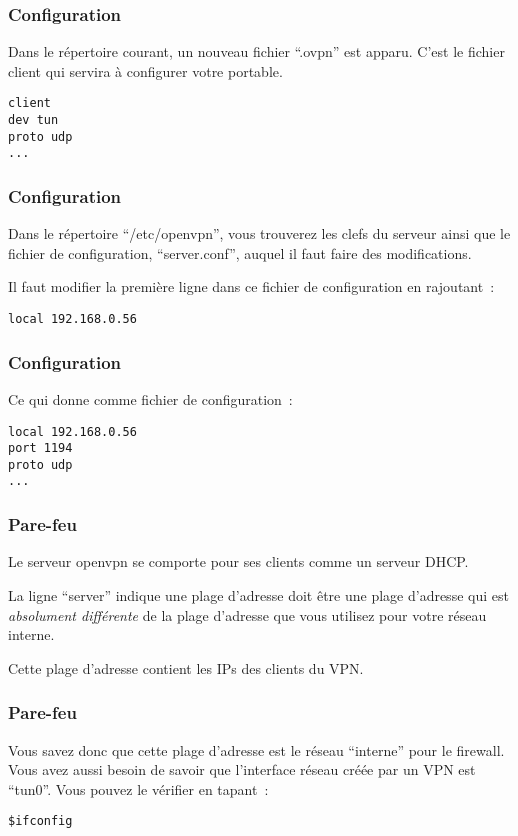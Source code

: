 \begin{frame}[containsverbatim]
\frametitle{Configuration}

Dans le répertoire courant, un nouveau fichier ``.ovpn'' est apparu. C'est le fichier client qui servira à configurer votre portable.

\begin{verbatim}
client
dev tun
proto udp
...
\end{verbatim}
\end{frame}

\begin{frame}[containsverbatim]
\frametitle{Configuration}

Dans le répertoire ``/etc/openvpn'', vous trouverez les clefs du serveur ainsi que le fichier de configuration, ``server.conf'',  auquel il faut faire des modifications.

Il faut modifier la première ligne dans ce fichier de configuration en rajoutant~:
\begin{verbatim}
local 192.168.0.56
\end{verbatim}

\end{frame}

\begin{frame}[containsverbatim]
\frametitle{Configuration}

Ce qui donne comme fichier de configuration~:
\begin{verbatim}
local 192.168.0.56
port 1194
proto udp
...
\end{verbatim}

\end{frame}


\begin{frame}[containsverbatim]
\frametitle{Pare-feu}

Le serveur openvpn se comporte pour ses clients comme un serveur DHCP. 

La ligne ``server'' indique une plage d'adresse doit être une plage d'adresse qui est \emph{absolument différente} de la plage d'adresse que vous utilisez pour votre réseau interne. 

Cette plage d'adresse contient les IPs des clients du VPN. 
\end{frame}

\begin{frame}[containsverbatim]
\frametitle{Pare-feu}

Vous savez donc que cette plage d'adresse est le réseau ``interne'' pour le firewall. Vous avez aussi besoin de savoir que l'interface réseau créée par un VPN est ``tun0''. Vous pouvez le vérifier en tapant~:
\begin{verbatim}
$ifconfig
\end{verbatim}  

\end{frame}

